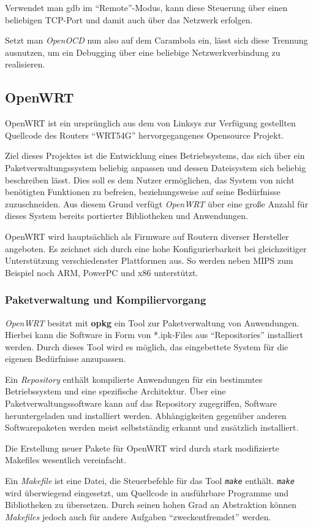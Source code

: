 Verwendet man \gls{gdb} im "`Remote"'-Modus, kann diese Steuerung über einen
beliebigen TCP-Port und damit auch über das Netzwerk erfolgen.

Setzt man \emph{OpenOCD} nun also auf dem Carambola ein, lässt sich diese Trennung
ausnutzen, um ein Debugging über eine beliebige Netzwerkverbindung zu
realisieren.
\subsection{OpenWRT}\label{subs:owrt}
OpenWRT ist ein ursprünglich aus dem von Linksys zur Verfügung
gestellten Quellcode des Routers "`WRT54G"' \cite{OWRT} hervorgegangenes
Opensource Projekt.

Ziel dieses Projektes ist die Entwicklung eines Betriebsystems, das sich
über ein Paketverwaltungssystem beliebig anpassen und dessen Dateisystem sich
beliebig beschreiben lässt. Dies soll es dem Nutzer ermöglichen, das System von
nicht benötigten Funktionen zu befreien, beziehungsweise auf seine Bedürfnisse
zuzuschneiden. Aus diesem Grund verfügt \emph{OpenWRT} über eine große Anzahl
für dieses System bereits portierter Bibliotheken und Anwendungen.

OpenWRT wird hauptsächlich als Firmware auf Routern diverser Hersteller
angeboten. Es zeichnet sich durch eine hohe Konfigurierbarkeit bei
gleichzeitiger Unterstützung verschiedenster Plattformen aus. So werden neben
MIPS zum Beispiel noch ARM, PowerPC und x86 unterstützt. 

 \subsubsection*{Paketverwaltung
und Kompiliervorgang} \emph{OpenWRT} besitzt mit \textbf{opkg} ein Tool zur Paketverwaltung von
Anwendungen.
Hierbei kann die Software in Form von *.ipk-Files aus "`Repositories"'
installiert werden. Durch dieses Tool wird es möglich, das eingebettete System
für die eigenen Bedürfnisse anzupassen.
\begin{definition}[Repository]
Ein \emph{Repository} enthält kompilierte Anwendungen für ein bestimmtes
Betriebssystem und eine spezifische Architektur. Über eine
Paketverwaltungssoftware kann auf das Repository zugegriffen, Software
heruntergeladen und installiert werden. Abhängigkeiten gegenüber anderen
Softwarepaketen werden meist selbstständig erkannt und zusätzlich installiert.
\end{definition}
Die Erstellung neuer Pakete für OpenWRT wird durch stark modifizierte Makefiles
wesentlich vereinfacht.
 \begin{definition}[Makefile]
Ein \emph{Makefile} ist eine Datei, die Steuerbefehle für das Tool
\emph{\texttt{make}} enthält. \emph{\texttt{make}} wird überwiegend eingesetzt,
um Quellcode in ausführbare Programme und Bibliotheken zu übersetzen. Durch seinen hohen
Grad an Abstraktion können \emph{Makefiles} jedoch auch für andere Aufgaben
"`zweckentfremdet"' werden.
\end{definition}

